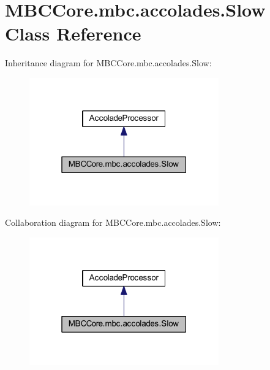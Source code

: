 \hypertarget{class_m_b_c_core_1_1mbc_1_1accolades_1_1_slow}{\section{M\-B\-C\-Core.\-mbc.\-accolades.\-Slow Class Reference}
\label{class_m_b_c_core_1_1mbc_1_1accolades_1_1_slow}
}


Inheritance diagram for M\-B\-C\-Core.\-mbc.\-accolades.\-Slow\-:\nopagebreak
\begin{figure}[H]
\begin{center}
\leavevmode
\includegraphics[width=232pt]{class_m_b_c_core_1_1mbc_1_1accolades_1_1_slow__inherit__graph}
\end{center}
\end{figure}


Collaboration diagram for M\-B\-C\-Core.\-mbc.\-accolades.\-Slow\-:\nopagebreak
\begin{figure}[H]
\begin{center}
\leavevmode
\includegraphics[width=232pt]{class_m_b_c_core_1_1mbc_1_1accolades_1_1_slow__coll__graph}
\end{center}
\end{figure}
